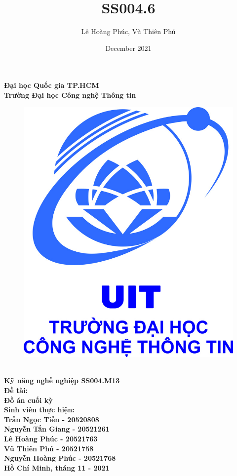 \documentclass[13pt,a4paper]{article}
\title{SS004.6}
\author{Lê Hoàng Phúc, Vũ Thiên Phú}
\date{December 2021}
\begin{document}
\begin{titlepage}
\begin{center}
    \centering
    \LARGE
    \textbf {Đại học Quốc gia TP.HCM\\}
    \textbf {Trường Đại học Công nghệ Thông tin\\[1.5cm]}
\end{center}



\begin{figure} [!htp]
  \centering
  \includegraphics {Logo}
\end{figure}

\begin{center}
    \Large
    \textbf{\huge\\[0.01cm] Kỹ năng nghề nghiệp SS004.M13\\[0.5cm]}
    \textbf{Đề tài:\\}
    \textbf{\huge Đồ án cuối kỳ \\[1 cm]}
    \textbf{Sinh viên thực hiện:\\}
    \textbf{Trần Ngọc Tiến - 20520808\\}
    \textbf{Nguyễn Tấn Giang - 20521261\\}
    \textbf{Lê Hoàng Phúc - 20521763\\}
    \textbf{Vũ Thiên Phú - 20521758\\}
    \textbf{Nguyễn Hoàng Phúc - 20521768\\[1.5cm]}
    \textbf{Hồ Chí Minh, tháng 11 - 2021}
\end{center}
\end{titlepage}
\thispagestyle{empty}
\setcounter{page}{0}
\end{document}
